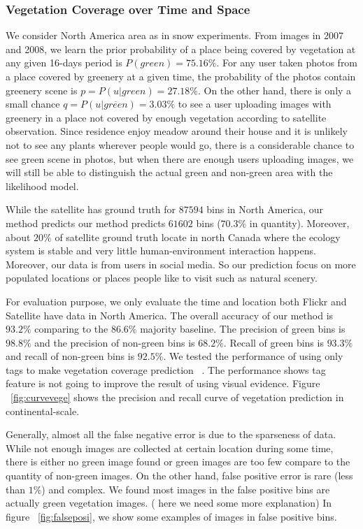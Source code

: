 \subsubsection{Vegetation Coverage over Time and Space}
We consider North America area as in snow experiments. From images in 2007 and 2008, 
we learn the prior probability of a place being covered by vegetation at any given 16-days period is $P(green) = 75.16\%$. 
For any user taken photos from a place covered by greenery at a given time, the probability of the photos contain greenery scene is 
$p = P(u|green) = 27.18\%$. On 
the other hand, there is only a small chance $q = P(u|\overline{green}) = 3.03\%$ to see a user uploading images with greenery in a place 
not covered by enough vegetation according to satellite observation. Since residence enjoy meadow around their house and it is unlikely not 
to see any plants wherever people would go, there is a considerable chance to see green scene in photos, but when there are enough users 
uploading images, we will still be able to distinguish the actual green and non-green area with the likelihood model.

While the satellite has ground truth for $87594$ bins in North America, our method predicts our method predicts $61602$ bins ($70.3\%$
 in quantity). Moreover, about $20\%$ of satellite ground truth locate in north Canada where the ecology system 
is stable and very little human-environment interaction happens. Moreover, our data is from users in social media. 
So our prediction focus on more populated locations or places people like to visit such as natural scenery.

For evaluation purpose, we only evaluate the time and location both Flickr and Satellite have data in North America. The overall accuracy 
of our method is $93.2\%$ comparing to the $86.6\%$ majority baseline. 
The precision of green bins is $98.8\%$ and the precision of non-green bins is $68.2\%$. Recall of green bins is $93.3\%$
 and recall of non-green bins is $92.5\%$. We tested the performance of using only tags to make vegetation coverage prediction 
~\cite{ecology2012www}. The performance shows tag
feature is not going to improve the result of using visual evidence. Figure ~\ref{fig:curvevege} shows the precision 
and recall curve of vegetation prediction in continental-scale.

Generally, almost all the false negative error is due to the sparseness of data. 
While not enough images are collected at certain location during some time, 
there is either no green image found or green images are too few compare to 
the quantity of non-green images. On the other hand, false positive error is rare 
(less than $1\%$) and complex. We found most images in the false positive bins are 
actually green vegetation images. ( here we need some more explanation) In figure ~\ref{fig:falseposi}, 
we show some examples of images in false positive bins. 


